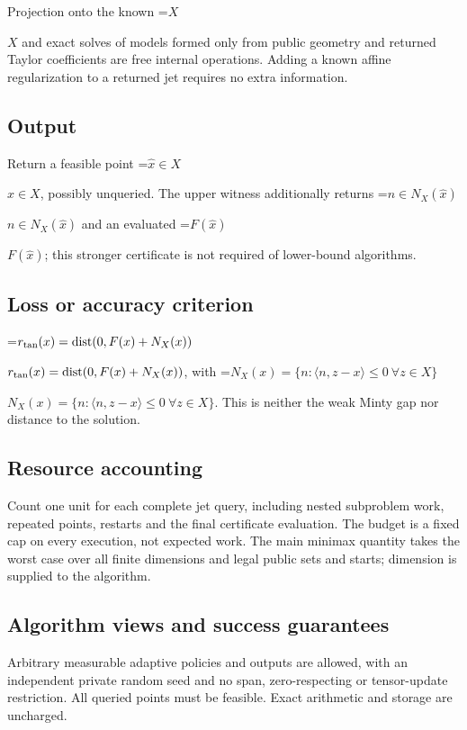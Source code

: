 \documentclass[10pt,a4paper]{article}
\newcommand{\AtlasMath}[1]{\par\begingroup\centering\setbox0=\hbox{$\displaystyle #1$}\ifdim\wd0>1.4\linewidth\typeout{ATLAS WIDE FORMULA: \the\wd0}\fi\ifdim\wd0>\linewidth\resizebox{\linewidth}{!}{\box0}\else\box0\fi\par\endgroup}
\newcommand{\AtlasInlineMath}[1]{\begingroup\setbox0=\hbox{$#1$}\ifdim\wd0>.4\linewidth\endgroup\AtlasMath{#1}\else\endgroup$#1$\fi}
\begin{document}
Projection onto the known \AtlasInlineMath{X} and exact solves of models formed only from public geometry and returned Taylor coefficients are free internal operations. Adding a known affine regularization to a returned jet requires no extra information.



\subsection{Output}


Return a feasible point \AtlasInlineMath{\widehat x\in X}, possibly unqueried. The upper witness additionally returns \AtlasInlineMath{n\in N_X(\widehat x)} and an evaluated \AtlasInlineMath{F(\widehat x)}; this stronger certificate is not required of lower-bound algorithms.



\subsection{Loss or accuracy criterion}


\AtlasInlineMath{r_{\rm tan}(x)=\operatorname{dist}(0,F(x)+N_X(x))}, with \AtlasInlineMath{N_X(x)=\{n:\langle n,z-x\rangle\le0\ \forall z\in X\}}. This is neither the weak Minty gap nor distance to the solution.



\subsection{Resource accounting}


Count one unit for each complete jet query, including nested subproblem work, repeated points, restarts and the final certificate evaluation. The budget is a fixed cap on every execution, not expected work. The main minimax quantity takes the worst case over all finite dimensions and legal public sets and starts; dimension is supplied to the algorithm.



\subsection{Algorithm views and success guarantees}


Arbitrary measurable adaptive policies and outputs are allowed, with an independent private random seed and no span, zero-respecting or tensor-update restriction. All queried points must be feasible. Exact arithmetic and storage are uncharged.
\end{document}
